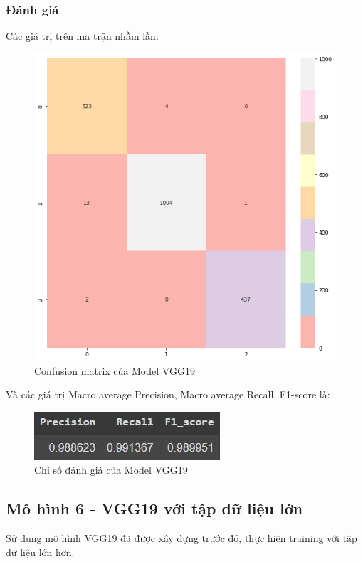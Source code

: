\subsubsection{Đánh giá}
Các giá trị trên ma trận nhầm lẫn:
\begin{center}
    \begin{figure}[!h]
        \centering
        \includegraphics[scale = 0.4]{fileanh/31.png}
        \caption{Confusion matrix của Model VGG19}
    \end{figure}
\end{center}
Và các giá trị Macro average Precision, Macro average Recall, F1-score là:
\begin{center}
    \begin{figure}[!h]
        \centering
        \includegraphics[scale = 1.5]{fileanh/32.jpg}
        \caption{Chỉ số đánh giá của Model VGG19}
    \end{figure}
\end{center}

\subsection{Mô hình 6 - VGG19 với tập dữ liệu lớn}
Sử dụng mô hình VGG19 đã được xây dựng trước đó, thực hiện training với tập dữ liệu lớn hơn.
